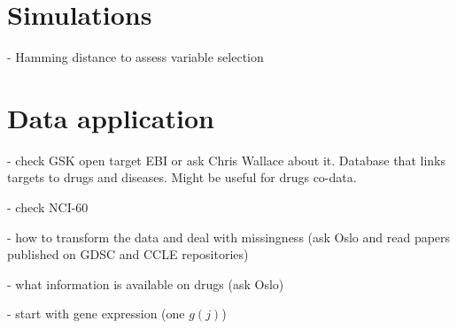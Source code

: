 \documentclass[a4paper,hidelinks]{article}\usepackage[]{graphicx}\usepackage[]{color}
\newcommand{\bgamma}{\bm{\gamma}}
\newcommand{\0}{\bm{0}}
\newcommand{\argmax}{\text{argmax} \,}
\newcommand{\E}{\mathbb{E}}
\renewcommand{\(}{\left(}
\renewcommand{\)}{\right)}
\renewcommand{\[}{\left[}
\renewcommand{\]}{\right]}
\begin{document}
	
	\section{Simulations}
	
	- Hamming distance to assess variable selection
	
	\section{Data application}
	- check GSK open target EBI or ask Chris Wallace about it. Database that links targets to drugs and diseases. Might be useful for drugs co-data.
	
	- check NCI-60
	
	- how to transform the data and deal with missingness (ask Oslo and read papers published on GDSC and CCLE repositories) 
	
	- what information is available on drugs (ask Oslo)
	
	- start with gene expression (one $g(j)$)
	
\end{document}
